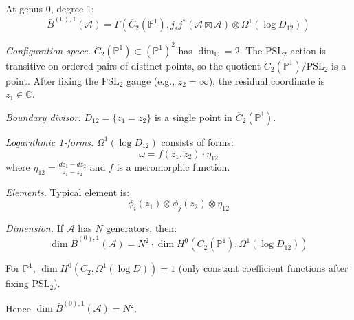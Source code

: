 \begin{example}\label{ex:bar-genus0-deg1}
At genus 0, degree 1:
\[\bar{B}^{(0),1}(\mathcal{A}) = \Gamma\left(\overline{C}_2(\mathbb{P}^1), j_*j^*(\mathcal{A} \boxtimes \mathcal{A}) \otimes \Omega^1(\log D_{12})\right)\]

\emph{Configuration space.} $C_2(\mathbb{P}^1) \subset (\mathbb{P}^1)^2$ has $\dim_\mathbb{C} = 2$. The $\text{PSL}_2$ action is transitive on ordered pairs of distinct points, so the quotient $C_2(\mathbb{P}^1)/\text{PSL}_2$ is a point. After fixing the $\text{PSL}_2$ gauge (e.g., $z_2 = \infty$), the residual coordinate is $z_1 \in \mathbb{C}$.

\emph{Boundary divisor.} $D_{12} = \{z_1 = z_2\}$ is a single point in $\overline{C}_2(\mathbb{P}^1)$.

\emph{Logarithmic 1-forms.} $\Omega^1(\log D_{12})$ consists of forms:
\[\omega = f(z_1, z_2) \cdot \eta_{12}\]
where $\eta_{12} = \frac{dz_1 - dz_2}{z_1 - z_2}$ and $f$ is a meromorphic function.

\emph{Elements.} Typical element is:
\[\phi_i(z_1) \otimes \phi_j(z_2) \otimes \eta_{12}\]

\emph{Dimension.} If $\mathcal{A}$ has $N$ generators, then:
\[\dim \bar{B}^{(0),1}(\mathcal{A}) = N^2 \cdot \dim H^0(\overline{C}_2(\mathbb{P}^1), \Omega^1(\log D_{12}))\]

For $\mathbb{P}^1$, $\dim H^0(\overline{C}_2, \Omega^1(\log D)) = 1$ (only constant coefficient functions after fixing $\text{PSL}_2$).

Hence $\dim \bar{B}^{(0),1}(\mathcal{A}) = N^2$.
\end{example}

